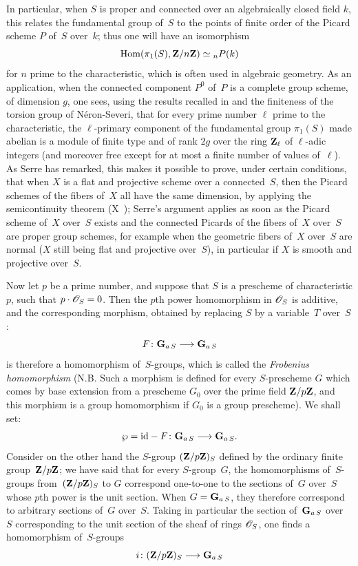 In particular, when $S$ is proper and connected over an
algebraically closed field $k$, this relates the fundamental
group of~$S$ to the points of finite order of the Picard
scheme $P$ of~$S$ over~$k$; thus one will have an isomorphism
$$
\operatorname{Hom}(\pi_1(S),\mathbf{Z}/n\mathbf{Z})\simeq {_n P}(k)
$$
for $n$ prime to the characteristic, which is often
used in algebraic
geometry. As an application, when the connected component $P^0$
of~$P$ is a complete group scheme, of dimension $g$, one sees,
using the results recalled in \No {} and the
finiteness of the torsion group of
N\'eron-Severi,
that for
every prime number $\ell$ prime to the characteristic, the
$\ell$-primary component of the fundamental group $\pi_1(S)$ made
abelian is a module of finite type and of rank $2g$ over the ring
$\mathbf{Z}_\ell$ of $\ell$-adic integers (and moreover free except for
at most a finite number of values of~$\ell$). As
Serre has remarked, this makes it possible to prove, under certain conditions, that when
$X$ is a flat and projective scheme over a connected~$S$, then the
Picard schemes of the fibers of~$X$ all have the same
dimension, by applying the semicontinuity theorem
(X~); Serre's argument applies as soon as the
Picard scheme of~$X$ over~$S$ exists and the connected
Picards of the fibers of~$X$ over~$S$ are proper group
schemes, for example when the geometric fibers of~$X$
over~$S$ are normal ($X$ still being flat and projective
over~$S$), in particular if $X$ is smooth and projective over~$S$.

Now let $p$ be a prime number, and suppose that $S$ is a
prescheme of characteristic $p$, \ie such that
$p\cdot\cal{O}_S=0$. Then the $p$th power homomorphism
in $\cal{O}_S$ is additive, and the corresponding morphism, obtained by
replacing $S$ by a variable~$T$ over~$S$:
$$
F\colon\GG_{a\,S}\to\GG_{a\,S}
$$
is therefore a homomorphism of~$S$-groups, which is called
the \emph{Frobenius homomorphism} (N.B. Such a morphism is
defined for every $S$-prescheme $G$ which comes by
base extension from a prescheme $G_0$ over the prime field
$\mathbf{Z}/p\mathbf{Z}$, and this morphism is a group homomorphism if $G_0$
is a group prescheme). We shall set:
$$
\wp=\id-F\colon\GG_{a\,S}\to\GG_{a\,S}.
$$
Consider on the other hand the $S$-group $(\mathbf{Z}/p\mathbf{Z})_S$ defined
by the ordinary finite group~$\mathbf{Z}/p\mathbf{Z}$; we have said that for every
$S$-group~$G$, the homomorphisms of~$S$-groups from~$(\mathbf{Z}/p\mathbf{Z})_S$
to $G$ correspond one-to-one to the sections of~$G$ over~$S$ whose
$p$th power is the unit section. When
$G=\mathbf{G}_{a\,S}$, they
therefore correspond to arbitrary sections of~$G$ over~$S$. Taking in particular
the section of~$\mathbf{G}_{a\,S}$ over~$S$ corresponding to the unit
section of the sheaf of rings $\cal{O}_S$, one finds a
homomorphism of~$S$-groups
$$
i\colon(\ZZ/p\ZZ)_S\to\GG_{a\,S}
$$

